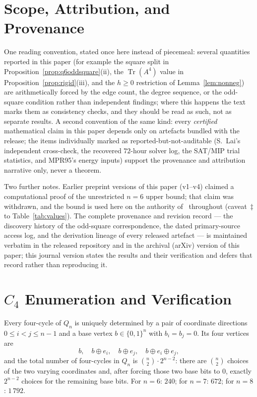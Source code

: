 \documentclass[12pt]{article}
\begin{document}
\section{Scope, Attribution, and Provenance}\label{sec:guide}

One reading convention, stated once here
instead of piecemeal: several quantities reported in this paper (for
example the square split in Proposition~\ref{prop:q6oddsquare}(ii), the
$\operatorname{Tr}(A^4)$ value in Proposition~\ref{prop:rigid}(iii), and
the $h\ge0$ restriction of Lemma~\ref{lem:nonneg}) are arithmetically
forced by the edge count, the degree sequence, or the odd-square
condition rather than independent findings; where this happens the text
marks them as consistency checks, and they should be read as such, not as
separate results.
A second convention of the same kind: every
\emph{certified} mathematical claim in this paper depends only on
artefacts bundled with the release; the items individually marked as
reported-but-not-auditable (S.~Lai's independent cross-check, the
recovered $72$-hour solver log, the SAT/MIP trial statistics, and MPR95's
energy inputs) support the provenance and attribution narrative only,
never a theorem.

Two further notes. Earlier preprint versions of this paper (v1--v4)
claimed a computational proof of the unrestricted $n=6$ upper bound;
that claim was withdrawn, and the bound is used here on the authority
of~\cite{HN94} throughout (caveat~$\ddagger$ to
Table~\ref{tab:values}). The complete provenance and revision record
--- the discovery history of the odd-square correspondence, the dated
primary-source access log, and the derivation lineage of every
released artefact --- is maintained verbatim in the released
repository and in the archival (arXiv) version of this paper; this
journal version states the results and their verification and defers
that record rather than reproducing it.


\section{\texorpdfstring{$C_4$}{C4} Enumeration and Verification}\label{sec:verify}

\begin{lemma}[$C_4$ enumeration in $Q_n$]\label{lem:c4}
Every four-cycle of $Q_n$ is uniquely determined by a pair of coordinate
directions $0\le i<j\le n-1$ and a base vertex $b\in\{0,1\}^n$ with
$b_i=b_j=0$.  Its four vertices are
\[
  b,\quad b\oplus e_i,\quad b\oplus e_j,\quad b\oplus e_i\oplus e_j,
\]
and the total number of four-cycles in $Q_n$ is $\binom{n}{2}\cdot2^{n-2}$:
there are $\binom{n}{2}$ choices of the two varying coordinates and, after
forcing those two base bits to $0$, exactly $2^{n-2}$ choices for the remaining
base bits. For $n=6$: $240$; for $n=7$: $672$; for $n=8$: $1\,792$.
\end{lemma}
\end{document}
